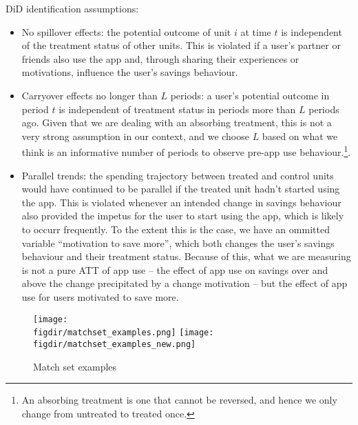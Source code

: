DiD identification assumptions:
\begin{itemize}
    \item No spillover effects: the potential outcome of unit $i$ at time $t$
        is independent of the treatment status of other units. This is violated
        if a user's partner or friends also use the app and, through sharing
        their experiences or motivations, influence the user's savings
        behaviour.

    \item Carryover effects no longer than $L$ periods: a user's potential
        outcome in period $t$ is independent of treatment status in periods
        more than $L$ periods ago. Given that we are dealing with an absorbing
        treatment, this is not a very strong assumption in our context, and we
        choose $L$ based on what we think is an informative number of periods
        to observe pre-app use behaviour.\footnote{An absorbing treatment is
            one that cannot be reversed, and hence we only change from
            untreated to treated once.}.

    \item Parallel trends: the spending trajectory between treated and control
        units would have continued to be parallel if the treated unit hadn't
        started using the app. This is violated whenever an intended change in
        savings behaviour also provided the impetus for the user to start using
        the app, which is likely to occurr frequently. To the extent this is
        the case, we have an ommitted variable ``motivation to save more'',
        which both changes the user's savings behaviour and their treatment
        status. Because of this, what we are measuring is not a pure ATT of app
        use -- the effect of app use on savings over and above the change
        precipitated by a change motivation -- but the effect of app use for
        users motivated to save more.

\end{itemize}


\begin{figure}[H]
    \centering
    \caption{Match set examples}%
    \texttt{[image: \\figdir/matchset\_examples.png]}
    \texttt{[image: \\figdir/matchset\_examples\_new.png]}
    \label{fig:matchset_examples}

    \fignote{\textwidth}{}

\end{figure}


